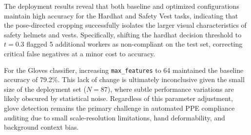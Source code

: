 \documentclass[11pt,a4paper]{article}
\begin{document}
The deployment results reveal that both baseline and optimized configurations maintain high accuracy for the Hardhat and Safety Vest tasks, indicating that the pose-directed cropping successfully isolates the larger visual characteristics of safety helmets and vests. Specifically, shifting the hardhat decision threshold to $t=0.3$ flagged 5 additional workers as non-compliant on the test set, correcting critical false negatives at a minor cost to accuracy. 

For the Gloves classifier, increasing \texttt{max\_features} to 64 maintained the baseline accuracy of 79.2\%. This lack of change is ultimately inconclusive given the small size of the deployment set ($N=87$), where subtle performance variations are likely obscured by statistical noise. Regardless of this parameter adjustment, glove detection remains the primary challenge in automated PPE compliance auditing due to small scale-resolution limitations, hand deformability, and background context bias.
\end{document}
